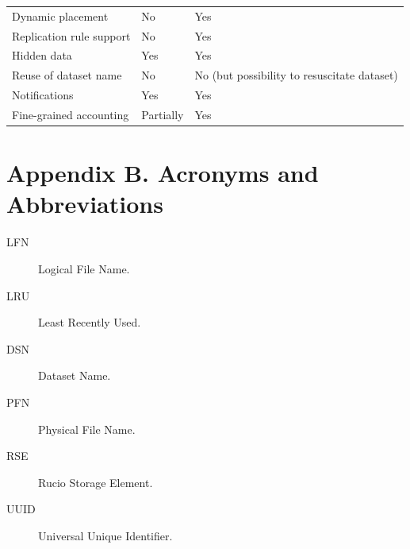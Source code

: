 \documentclass{atlasnote}
\begin{document}
\begin{tabular}{l l p{5cm} }
Dynamic placement
 & 
No
 & 
Yes
\\

Replication rule support
 & 
No
 & 
Yes
\\

Hidden data
 & 
Yes
 & 
Yes
\\

Reuse of dataset name
 & 
No
 & 
No (but possibility to resuscitate dataset)
\\

Notifications
 & 
Yes
 & 
Yes
\\

Fine-grained accounting
 & 
Partially
 & 
Yes
\\
\bottomrule
\end{tabular}


\newpage
\section*{Appendix B. Acronyms and Abbreviations}
\label{Acronyms_and_Abbreviations:acronyms-and-abbreviations}\label{Acronyms_and_Abbreviations::doc}\begin{description}
\item[{LFN}] \leavevmode
Logical File Name.

\item[{LRU}] \leavevmode
Least Recently Used.

\item[{DSN}] \leavevmode
Dataset Name.

\item[{PFN}] \leavevmode
Physical File Name.

\item[{RSE}] \leavevmode
Rucio Storage Element.

\item[{UUID}] \leavevmode
Universal Unique Identifier.

\end{description}
\end{document}
